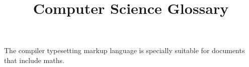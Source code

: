 \documentclass{article}
\title{Computer Science Glossary}
\author{ }
\date{ }
\begin{document}
\maketitle
 
The \Gls{compiler} typesetting markup language is specially suitable for documents that include \gls{maths}. 
 
\clearpage
 
\printglossaries
 
\end{document}
